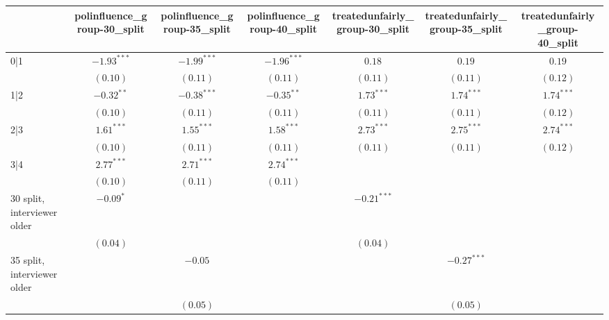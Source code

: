 
\usepackage{booktabs}
\usepackage{threeparttable}

\begin{table}
\begin{center}
\begin{threeparttable}
\begin{tabular}{l c c c c c c}
\toprule
 & polinfluence_group-30_split & polinfluence_group-35_split & polinfluence_group-40_split & treatedunfairly_group-30_split & treatedunfairly_group-35_split & treatedunfairly_group-40_split \\
\midrule
0|1                             & $-1.93^{***}$ & $-1.99^{***}$ & $-1.96^{***}$ & $0.18$        & $0.19$        & $0.19$        \\
                                & $(0.10)$      & $(0.11)$      & $(0.11)$      & $(0.11)$      & $(0.11)$      & $(0.12)$      \\
1|2                             & $-0.32^{**}$  & $-0.38^{***}$ & $-0.35^{**}$  & $1.73^{***}$  & $1.74^{***}$  & $1.74^{***}$  \\
                                & $(0.10)$      & $(0.11)$      & $(0.11)$      & $(0.11)$      & $(0.11)$      & $(0.12)$      \\
2|3                             & $1.61^{***}$  & $1.55^{***}$  & $1.58^{***}$  & $2.73^{***}$  & $2.75^{***}$  & $2.74^{***}$  \\
                                & $(0.10)$      & $(0.11)$      & $(0.11)$      & $(0.11)$      & $(0.11)$      & $(0.12)$      \\
3|4                             & $2.77^{***}$  & $2.71^{***}$  & $2.74^{***}$  &               &               &               \\
                                & $(0.10)$      & $(0.11)$      & $(0.11)$      &               &               &               \\
30 split, interviewer older     & $-0.09^{*}$   &               &               & $-0.21^{***}$ &               &               \\
                                & $(0.04)$      &               &               & $(0.04)$      &               &               \\
35 split, interviewer older     &               & $-0.05$       &               &               & $-0.27^{***}$ &               \\
                                &               & $(0.05)$      &               &               & $(0.05)$      &               \\

\end{tabular}
\end{threeparttable}
\end{center}
\end{table}
